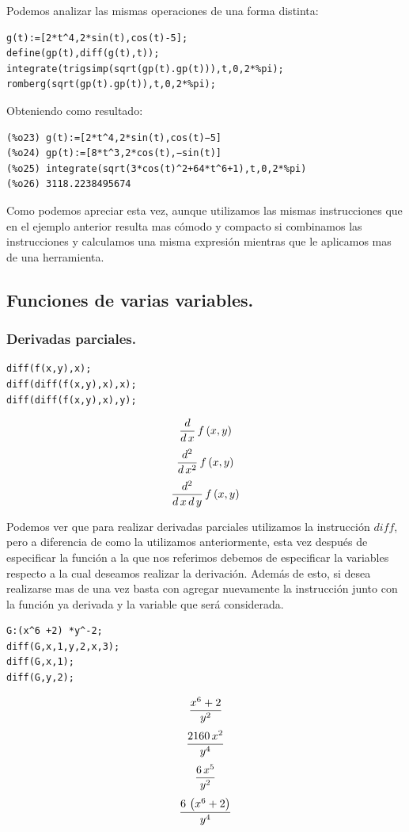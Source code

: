 \documentclass[12pt]{article}
\begin{document}
Podemos analizar las mismas operaciones de una forma distinta:
\begin{verbatim}
g(t):=[2*t^4,2*sin(t),cos(t)-5];
define(gp(t),diff(g(t),t));
integrate(trigsimp(sqrt(gp(t).gp(t))),t,0,2*%pi);
romberg(sqrt(gp(t).gp(t)),t,0,2*%pi);
\end{verbatim}
Obteniendo como resultado:
\begin{verbatim}
(%o23) g(t):=[2*t^4,2*sin(t),cos(t)−5]
(%o24) gp(t):=[8*t^3,2*cos(t),−sin(t)]
(%o25) integrate(sqrt(3*cos(t)^2+64*t^6+1),t,0,2*%pi)
(%o26) 3118.2238495674
\end{verbatim} 

Como podemos apreciar esta vez, aunque utilizamos las mismas instrucciones que en el ejemplo anterior resulta mas cómodo y compacto si combinamos las instrucciones y calculamos una misma expresión mientras que le aplicamos mas de una herramienta.

\subsection*{Funciones de varias variables.}
\subsubsection*{Derivadas parciales.}

\begin{verbatim}
diff(f(x,y),x);
diff(diff(f(x,y),x),x);
diff(diff(f(x,y),x),y);
\end{verbatim}

$${{d}\over{d\,x}}\,f\left(x , y\right)$$
$${{d^2}\over{d\,x^2}}\,f\left(x , y\right)$$
$${{d^2}\over{d\,x\,d\,y}}\,f\left(x , y\right)$$

Podemos ver que para realizar derivadas parciales utilizamos la instrucción $diff$, pero a diferencia de como la utilizamos anteriormente, esta vez después de especificar la función a la que nos referimos debemos de especificar la variables respecto a la cual deseamos realizar la derivación. Además de esto, si desea realizarse mas de una vez basta con agregar nuevamente la instrucción junto con la función ya derivada y la variable que será considerada.

\begin{verbatim}
G:(x^6 +2) *y^-2;
diff(G,x,1,y,2,x,3);
diff(G,x,1);
diff(G,y,2);
\end{verbatim}

$${{x^6+2}\over{y^2}}$$
$${{2160\,x^2}\over{y^4}}$$
$${{6\,x^5}\over{y^2}}$$
$${{6\,\left(x^6+2\right)}\over{y^4}}$$
\end{document}
